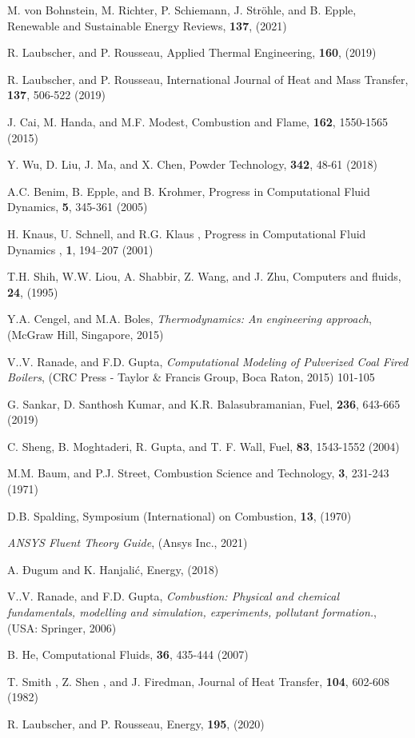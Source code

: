 \documentclass{webofc}
\begin{document}
\begin{thebibliography}{}
%
%

M. von Bohnstein,  M. Richter, P. Schiemann, J. Str{\"{o}}hle, and B. Epple, Renewable and Sustainable Energy Reviews, \textbf{137}, (2021)

R. Laubscher, and P. Rousseau, Applied Thermal Engineering, \textbf{160}, (2019)

R. Laubscher, and P. Rousseau, International Journal of Heat and Mass Transfer, \textbf{137}, 506-522 (2019)

J. Cai, M. Handa, and  M.F. Modest, Combustion and Flame, \textbf{162}, 1550-1565 (2015)

Y. Wu, D. Liu, J. Ma, and X. Chen, Powder Technology, \textbf{342}, 48-61 (2018)

A.C. Benim,  B. Epple, and  B. Krohmer, Progress in Computational Fluid Dynamics, \textbf{5}, 345-361 (2005)

H. Knaus, U. Schnell, and R.G. Klaus , Progress in Computational Fluid Dynamics , \textbf{1}, 194–207 (2001)

T.H. Shih, W.W. Liou, A. Shabbir, Z. Wang, and J. Zhu, Computers and fluids, \textbf{24}, (1995)


Y.A. Cengel, and M.A. Boles, \textit{Thermodynamics: An engineering approach}, (McGraw Hill, Singapore, 2015)


V..V. Ranade, and F.D. Gupta, \textit{Computational Modeling of Pulverized Coal Fired Boilers}, (CRC Press - Taylor {\&} Francis Group, Boca Raton, 2015) 101-105


G. Sankar, D. Santhosh Kumar, and K.R. Balasubramanian, Fuel, \textbf{236}, 643-665 (2019)

C. Sheng, B. Moghtaderi, R. Gupta, and T. F. Wall, Fuel, \textbf{83}, 1543-1552 (2004)

M.M. Baum, and P.J. Street, Combustion Science and Technology, \textbf{3}, 231-243 (1971) 


D.B. Spalding, Symposium (International) on Combustion, \textbf{13}, (1970)

\textit{ANSYS Fluent Theory Guide}, (Ansys Inc., 2021)

A. Đugum and K. Hanjalić, Energy, (2018)

V..V. Ranade, and F.D. Gupta, \textit{Combustion: Physical and chemical fundamentals, modelling and simulation, experiments, pollutant formation.}, (USA: Springer, 2006)


B. He, Computational Fluids, \textbf{36}, 435-444 (2007)

T. Smith , Z. Shen , and J. Firedman, Journal of Heat Transfer, \textbf{104}, 602-608 (1982)

R. Laubscher,  and P. Rousseau, Energy, \textbf{195}, (2020)





\end{thebibliography}
\end{document}
